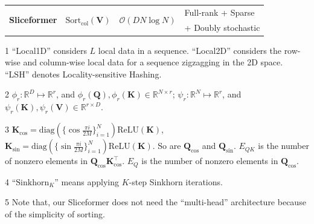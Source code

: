 \begin{table}[t]
{\begin{threeparttable}
{\begin{tabular}{l|lll}
    \midrule
    \multirow{2}{*}{\textbf{Sliceformer}}  & 
    \multirow{2}{*}{$\text{Sort}_{\text{col}}(\bm{V})$} & 
    \multirow{2}{*}{$\mathcal{O}(DN\log N)$} &
    Full-rank + Sparse\\
    &
    &
    &
    + Doubly stochastic\\
    \bottomrule
    \end{tabular}
    }
    \begin{tablenotes}
    \item[1] \footnotesize{``Local1D'' considers $L$ local data in a sequence. ``Local2D'' considers the row-wise and column-wise local data for a sequence zigzagging in the 2D space. ``LSH'' denotes Locality-sensitive Hashing.}
    \item[2] \footnotesize{$\phi_r: \mathbb{R}^{D}\mapsto\mathbb{R}^r$, and $\phi_r(\bm{Q}),\phi_r(\bm{K})\in\mathbb{R}^{N\times r}$; $\psi_r: \mathbb{R}^{N}\mapsto\mathbb{R}^r$, and $\psi_r(\bm{K}),\psi_r(\bm{V})\in\mathbb{R}^{r\times D}$.}
    \item[3] $\bm{K}_{\cos}=\text{diag}(\{\cos\frac{\pi i}{2M}\}_{i=1}^{N})\text{ReLU}(\bm{K})$, $\bm{K}_{\sin}=\text{diag}(\{\sin\frac{\pi i}{2M}\}_{i=1}^{N})\text{ReLU}(\bm{K})$. So are $\bm{Q}_{\cos}$ and $\bm{Q}_{\sin}$. 
    $E_{QK}$ is the number of nonzero elements in $\bm{Q}_{\cos}\bm{K}_{\cos}^{\top}$. $E_Q$ is the number of nonzero elements in $\bm{Q}_{\cos}$.
    \item[4] ``$\text{Sinkhorn}_{K}$'' means applying $K$-step Sinkhorn iterations.
    \item[5] Note that, our Sliceformer does not need the ``multi-head'' architecture because of the simplicity of sorting.
    \end{tablenotes}
    \end{threeparttable}
}
\end{table}


